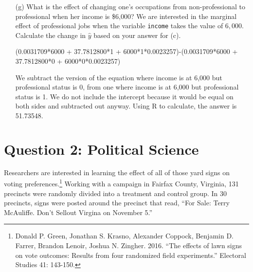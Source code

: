 \documentclass[12pt,letterpaper]{article}
\begin{document}
\begin{enumerate}
	Plugging the numbers into the equation looks like:
		
		
		(0.0031709*1,000 + 37.7812800*1 + 1,000*1*0.0023257)-(0.0031709*0 + 37.7812800*1 + 0*1*0.0023257)
		
		We subtract the version of the equation where income is at 0 but professional status is 1, from one where income is at 1,000 and professional status is 1.
		We do not include the intercept because it would be subtracted out anyway. 
		Using R to calculate, the answer is 5.4966
		
	\vspace{10cm}
	
	
	\item [(g)]
	What is the effect of changing one's occupations from non-professional to professional when her income is \$6,000? We are interested in the marginal effect of professional jobs when the variable \texttt{income} takes the value of $6,000$. Calculate the change in $\hat{y}$ based on your answer for (c).
	
			(0.0031709*6000 + 37.7812800*1 + 6000*1*0.0023257)-(0.0031709*6000 + 37.7812800*0 + 6000*0*0.0023257)

			We subtract the version of the equation where income is at 6,000 but professional status is 0, from one where income is at 6,000 but professional status is 1.
			We do not include the intercept because it would be equal on both sides and subtracted out anyway.
			Using R to calculate, the answer is 51.73548.
	
\end{enumerate}

\newpage

\section*{Question 2: Political Science}
\vspace{.25cm}
\noindent 	Researchers are interested in learning the effect of all of those yard signs on voting preferences.\footnote{Donald P. Green, Jonathan	S. Krasno, Alexander Coppock, Benjamin D. Farrer,	Brandon Lenoir, Joshua N. Zingher. 2016. ``The effects of lawn signs on vote outcomes: Results from four randomized field experiments.'' Electoral Studies 41: 143-150. } Working with a campaign in Fairfax County, Virginia, 131 precincts were randomly divided into a treatment and control group. In 30 precincts, signs were posted around the precinct that read, ``For Sale: Terry McAuliffe. Don't Sellout Virgina on November 5.'' \\
\end{document}
